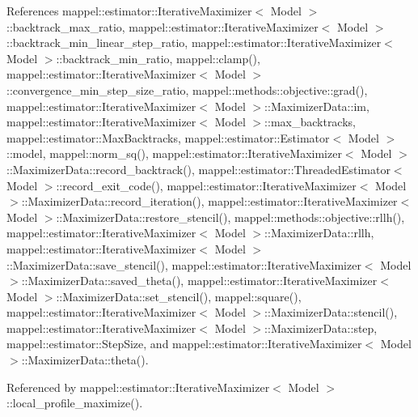 References mappel\+::estimator\+::\+Iterative\+Maximizer$<$ Model $>$\+::backtrack\+\_\+max\+\_\+ratio, mappel\+::estimator\+::\+Iterative\+Maximizer$<$ Model $>$\+::backtrack\+\_\+min\+\_\+linear\+\_\+step\+\_\+ratio, mappel\+::estimator\+::\+Iterative\+Maximizer$<$ Model $>$\+::backtrack\+\_\+min\+\_\+ratio, mappel\+::clamp(), mappel\+::estimator\+::\+Iterative\+Maximizer$<$ Model $>$\+::convergence\+\_\+min\+\_\+step\+\_\+size\+\_\+ratio, mappel\+::methods\+::objective\+::grad(), mappel\+::estimator\+::\+Iterative\+Maximizer$<$ Model $>$\+::\+Maximizer\+Data\+::im, mappel\+::estimator\+::\+Iterative\+Maximizer$<$ Model $>$\+::max\+\_\+backtracks, mappel\+::estimator\+::\+Max\+Backtracks, mappel\+::estimator\+::\+Estimator$<$ Model $>$\+::model, mappel\+::norm\+\_\+sq(), mappel\+::estimator\+::\+Iterative\+Maximizer$<$ Model $>$\+::\+Maximizer\+Data\+::record\+\_\+backtrack(), mappel\+::estimator\+::\+Threaded\+Estimator$<$ Model $>$\+::record\+\_\+exit\+\_\+code(), mappel\+::estimator\+::\+Iterative\+Maximizer$<$ Model $>$\+::\+Maximizer\+Data\+::record\+\_\+iteration(), mappel\+::estimator\+::\+Iterative\+Maximizer$<$ Model $>$\+::\+Maximizer\+Data\+::restore\+\_\+stencil(), mappel\+::methods\+::objective\+::rllh(), mappel\+::estimator\+::\+Iterative\+Maximizer$<$ Model $>$\+::\+Maximizer\+Data\+::rllh, mappel\+::estimator\+::\+Iterative\+Maximizer$<$ Model $>$\+::\+Maximizer\+Data\+::save\+\_\+stencil(), mappel\+::estimator\+::\+Iterative\+Maximizer$<$ Model $>$\+::\+Maximizer\+Data\+::saved\+\_\+theta(), mappel\+::estimator\+::\+Iterative\+Maximizer$<$ Model $>$\+::\+Maximizer\+Data\+::set\+\_\+stencil(), mappel\+::square(), mappel\+::estimator\+::\+Iterative\+Maximizer$<$ Model $>$\+::\+Maximizer\+Data\+::stencil(), mappel\+::estimator\+::\+Iterative\+Maximizer$<$ Model $>$\+::\+Maximizer\+Data\+::step, mappel\+::estimator\+::\+Step\+Size, and mappel\+::estimator\+::\+Iterative\+Maximizer$<$ Model $>$\+::\+Maximizer\+Data\+::theta().



Referenced by mappel\+::estimator\+::\+Iterative\+Maximizer$<$ Model $>$\+::local\+\_\+profile\+\_\+maximize().

